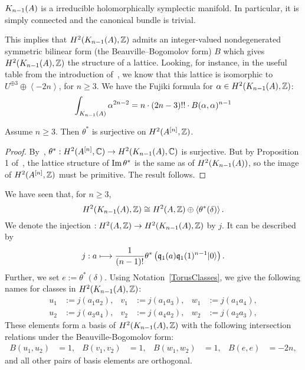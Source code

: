 \begin{theorem}\cite[Th\'eor\`eme 4]{Beauville}
$\kum{A}{n-1}$ is a irreducible holomorphically symplectic manifold. In particular, it is simply connected and the canonical bundle is trivial.
\end{theorem}
This implies that $H^2(\kum{A}{n-1},\Z)$ admits an integer-valued nondegenerated symmetric bilinear form (the Beauville--Bogomolov form) $B$ which gives $H^2(\kum{A}{n-1},\Z)$ the structure of a lattice. Looking, for instance, in the useful table from the introduction of~\cite{Rapagnetta}, we know that this lattice is
isomorphic to $U^{\oplus 3}\oplus \left< -2n \right>$, for $n\geq 3$. 
We have the Fujiki formula for $\alpha\in H^2(\kum{A}{n-1},\Z)$:
\begin{equation} \label{fujiki}
\int_{\kum{A}{n-1}} \alpha^{2n-2} = n\cdot(2n-3)!!\cdot B(\alpha,\alpha)^{n-1}
\end{equation}

\begin{proposition}\label{H2Sur} Assume $n\geq 3$. Then
$\theta^*$ is surjective on $H^2(A\hilb{n},\Z)$.
\end{proposition}
\begin{proof}
By~\cite[Sect.~7]{Beauville}, $\theta^{\ast} : H^2(A\hilb{n},\C) \rightarrow H^2(\kum{A}{n-1},\C)$ is surjective. 
But by Proposition 1 of~\cite{Britze}, the lattice structure of $\im \theta^*$ is the same as of $H^2(\kum{A}{n-1})$, so the image of $H^2(A\hilb{n},\Z)$ must be primitive. The result follows.
\end{proof}
\begin{notation}\label{BasisH2KA}
 We have seen that, for $n\geq 3$,
 $$
 H^2(\kum{A}{n-1},\Z) \cong H^2(A,\Z) \oplus\left<\theta^*(\delta)\right>.
 $$
We denote the injection $ : H^2(A,\Z) \rightarrow H^2(\kum{A}{n-1},\Z)$ by $j$. It can be described by 
$$
j : a \longmapsto \frac{1}{(n-1)!}\theta^*\left(\q_1(a)\q_1(1)^{n-1}\vac\right).
$$ 
Further, we set $e:=\theta^*(\delta)$. Using Notation~\ref{TorusClasses}, we give the following names for classes in $H^2(\kum{A}{n-1},\Z)$:
\begin{align*}
u_1 &:= j(a_1 a_2), & v_1 &:= j(a_1 a_3), & w_1 &:= j(a_1 a_4), \\ 
u_2 &:= j(a_3 a_4), & v_2 &:= j(a_4 a_2), & w_2 &:= j(a_2 a_3),
\end{align*}
These elements form a basis of $H^2(\kum{A}{n-1},\Z)$ with the following intersection relations under the Beauville-Bogomolov form:
\begin{align*}
B(u_1,u_2) &= 1, & B(v_1,v_2) &= 1, & B(w_1,w_2) &= 1,  &
B(e,e)&= -2n,
\end{align*}
and all other pairs of basis elements are orthogonal.
\end{notation}

